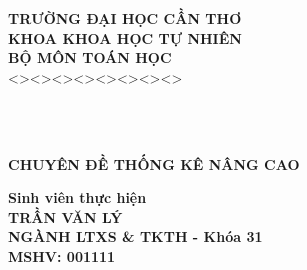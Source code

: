 \documentclass[a4paper,oneside]{../../styles/thesis}
\newlength{\defbaselineskip}
\newcommand{\setlinespacing}[1]%
           {\setlength{\baselineskip}{#1 \defbaselineskip}}
\begin{document}
\newpage


\begin{titlepage}

\hspace{2.8cm} {\bf \fontsize{16pt}{16}\selectfont TRƯỜNG ĐẠI HỌC CẦN THƠ}\\
\vspace*{0.05cm}
\hspace{3.3cm} {\bf\fontsize{16pt}{16}\selectfont KHOA KHOA HỌC TỰ NHIÊN}\\
 \vspace*{0.05cm}
\hspace{4.3cm} {\bf\fontsize{16pt}{16}\selectfont BỘ MÔN TOÁN HỌC}\\
\vspace*{0.05cm}
\hspace{5 cm} <><><><><><><><> 


\vspace*{2cm}

\\
 \vspace*{0.05cm}\\
\vspace*{2cm}

\begin{center}
 {\bf\fontsize{20pt}{28}\selectfont CHUYÊN ĐỀ THỐNG KÊ NÂNG CAO }   
\end{center}




\vspace*{1.5cm}

\begin{center}
\textbf{Sinh viên thực hiện}\\    
\textbf{TRẦN VĂN LÝ}\\
\textbf{NGÀNH LTXS \& TKTH - Khóa 31}\\
\textbf{MSHV: 001111}
\end{center}



\vspace*{3cm}
\end{titlepage}

\setlinespacing{1.2}

\tableofcontents %
\newpage
{}
\listoffigures %
\end{document}
